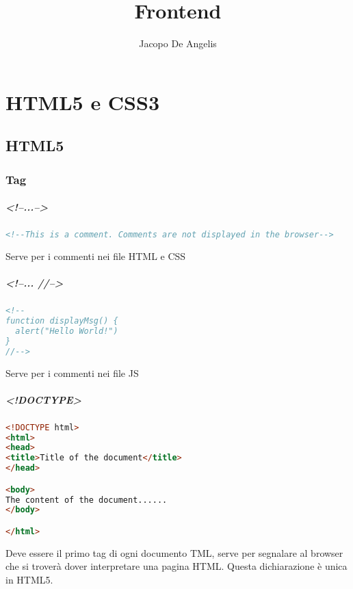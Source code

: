 \documentclass[11pt,a4paper]{book}
\begin{document}
\title{Frontend}
\author{Jacopo De Angelis}
\maketitle

\pagebreak
\tableofcontents
\pagebreak

\chapter{HTML5 e CSS3}
\section{HTML5}
\subsection{Tag}
\paragraph{<!--...-->}
\begin{lstlisting}[language = HTML]
<!--This is a comment. Comments are not displayed in the browser-->
\end{lstlisting}
Serve per i commenti nei file HTML e CSS

\paragraph{<!--... //-->}
\begin{lstlisting}[language = HTML]
<!--
function displayMsg() {
  alert("Hello World!")
}
//-->
\end{lstlisting}
Serve per i commenti nei file JS

\paragraph{<!DOCTYPE>}
\begin{lstlisting}[language = HTML]
<!DOCTYPE html>
<html>
<head>
<title>Title of the document</title>
</head>

<body>
The content of the document......
</body>

</html>
\end{lstlisting}
Deve essere il primo tag di ogni documento TML, serve per segnalare al browser che si troverà dover interpretare una pagina HTML. Questa dichiarazione è unica in HTML5.
\end{document}

